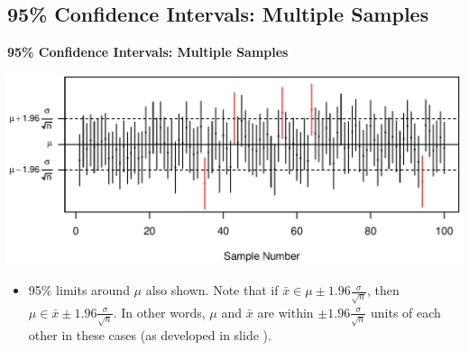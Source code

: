\documentclass[compress]{beamer}        %
\makeatletter
\newcommand{\tcb}{\textcolor{beamer@blendedblue}}
\makeatother
\begin{document}
\subsection{95\% Confidence Intervals: Multiple Samples}
\begin{frame}{\bf \tcb{95\% Confidence Intervals: Multiple Samples}\\[-1.1cm]}

\begin{center}
\includegraphics[width=1\textwidth, trim = 0.5cm 0.5cm 1cm 1.3cm, clip]{CIsLimits}
\end{center}

\begin{itemize}
\item 95\% limits around $\mu$ also shown. Note that if $\bar x \in \mu \pm 1.96 \frac{\sigma}{\sqrt{n}}$, then $\mu \in \bar x \pm 1.96 \frac{\sigma}{\sqrt{n}}$. In other words, $\mu$ and $\bar x$ are within $\pm1.96\frac{\sigma}{\sqrt{n}}$ units of each other in these cases (as developed in slide \pageref{maniplims}).
\end{itemize}


\end{frame}
\end{document}
